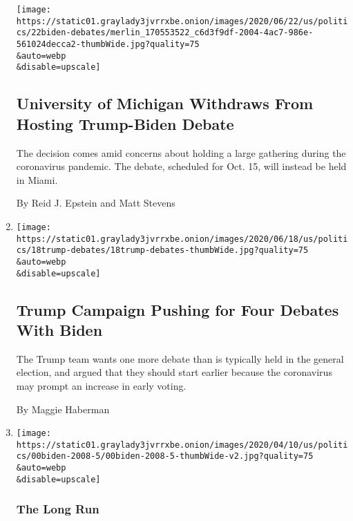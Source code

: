 \begin{enumerate}
  \texttt{[image: https://static01.graylady3jvrrxbe.onion/images/2020/06/22/us/politics/22biden-debates/merlin\_170553522\_c6d3f9df-2004-4ac7-986e-561024decca2-thumbWide.jpg?quality=75\\\&auto=webp\\\&disable=upscale]}

  \hypertarget{university-of-michigan-withdraws-from-hosting-trump-biden-debate}{%
  \subsection{University of Michigan Withdraws From Hosting Trump-Biden
  Debate}\label{university-of-michigan-withdraws-from-hosting-trump-biden-debate}}

  The decision comes amid concerns about holding a large gathering
  during the coronavirus pandemic. The debate, scheduled for Oct. 15,
  will instead be held in Miami.

  By Reid J. Epstein and Matt Stevens
\item
  \href{/2020/06/18/us/politics/trump-presidential-debates-2020.html}{}

  \texttt{[image: https://static01.graylady3jvrrxbe.onion/images/2020/06/18/us/politics/18trump-debates/18trump-debates-thumbWide.jpg?quality=75\\\&auto=webp\\\&disable=upscale]}

  \hypertarget{trump-campaign-pushing-for-four-debates-with-biden}{%
  \subsection{Trump Campaign Pushing for Four Debates With
  Biden}\label{trump-campaign-pushing-for-four-debates-with-biden}}

  The Trump team wants one more debate than is typically held in the
  general election, and argued that they should start earlier because
  the coronavirus may prompt an increase in early voting.

  By Maggie Haberman
\item
  \href{/2020/05/11/us/politics/joe-biden-sarah-palin-2008.html}{}

  \texttt{[image: https://static01.graylady3jvrrxbe.onion/images/2020/04/10/us/politics/00biden-2008-5/00biden-2008-5-thumbWide-v2.jpg?quality=75\\\&auto=webp\\\&disable=upscale]}

  \hypertarget{the-long-run}{%
  \subsubsection{The Long Run}\label{the-long-run}}


\end{enumerate}
